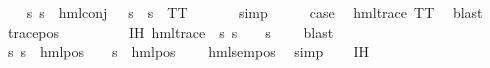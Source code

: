 \begin{isabellebody}
\ \ \isamarkupfalse%
\ {\isachardoublequoteopen}{\isacharparenleft}{\kern0pt}{\isasymforall}s{\isachardot}{\kern0pt}\ {\isacharparenleft}{\kern0pt}s\ {\isasymTurnstile}\ hml{\isacharunderscore}{\kern0pt}conj\ {\isacharbraceleft}{\kern0pt}{\isacharbraceright}{\kern0pt}\ {\isacharbraceleft}{\kern0pt}{\isacharbraceright}{\kern0pt}\ {\isasympsi}s{\isacharparenright}{\kern0pt}\ {\isacharequal}{\kern0pt}\ {\isacharparenleft}{\kern0pt}s\ {\isasymTurnstile}\ TT{\isacharparenright}{\kern0pt}{\isacharparenright}{\kern0pt}{\isachardoublequoteclose}\ \isanewline
\ \ \ \ \isamarkupfalse%
\ simp\isanewline
\ \ \isamarkupfalse%
\ \isamarkupfalse%
\ {\isacharquery}{\kern0pt}case\ \isamarkupfalse%
\ {\isacartoucheopen}hml{\isacharunderscore}{\kern0pt}trace\ TT{\isacartoucheclose}\ \isamarkupfalse%
\ blast\isanewline
{}\isamarkupfalse%
\isanewline
\ \ \isamarkupfalse%
\ {\isacharparenleft}{\kern0pt}trace{\isacharunderscore}{\kern0pt}pos\ {\isasymphi}\ {\isasymalpha}{\isacharparenright}{\kern0pt}\isanewline
\ \ \isamarkupfalse%
\ \isamarkupfalse%
\ {\isasympsi}\ \ IH{\isacharcolon}{\kern0pt}\ {\isachardoublequoteopen}hml{\isacharunderscore}{\kern0pt}trace\ {\isasympsi}{\isachardoublequoteclose}\ {\isachardoublequoteopen}{\isacharparenleft}{\kern0pt}{\isasymforall}s{\isachardot}{\kern0pt}\ {\isacharparenleft}{\kern0pt}s\ {\isasymTurnstile}\ {\isasymphi}{\isacharparenright}{\kern0pt}\ {\isacharequal}{\kern0pt}\ {\isacharparenleft}{\kern0pt}s\ {\isasymTurnstile}\ {\isasympsi}{\isacharparenright}{\kern0pt}{\isacharparenright}{\kern0pt}{\isachardoublequoteclose}\ \isamarkupfalse%
\ blast\isanewline
\ \ \isamarkupfalse%
\ {\isachardoublequoteopen}{\isacharparenleft}{\kern0pt}{\isasymforall}s{\isachardot}{\kern0pt}\ {\isacharparenleft}{\kern0pt}s\ {\isasymTurnstile}\ hml{\isacharunderscore}{\kern0pt}pos\ {\isasymalpha}\ {\isasymphi}{\isacharparenright}{\kern0pt}\ {\isacharequal}{\kern0pt}\ {\isacharparenleft}{\kern0pt}s\ {\isasymTurnstile}\ {\isacharparenleft}{\kern0pt}hml{\isacharunderscore}{\kern0pt}pos\ {\isasymalpha}\ {\isasympsi}{\isacharparenright}{\kern0pt}{\isacharparenright}{\kern0pt}{\isacharparenright}{\kern0pt}{\isachardoublequoteclose}\ \isamarkupfalse%
\ hml{\isacharunderscore}{\kern0pt}sem{\isacharunderscore}{\kern0pt}pos\ \isamarkupfalse%
\ simp\isanewline
\ \ \isamarkupfalse%
\ IH\ \isamarkupfalse%

\end{isabellebody}
